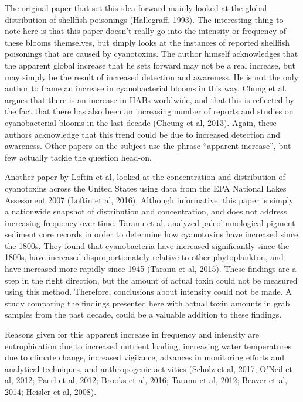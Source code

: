 \documentclass[11pt,]{article}
\begin{document}
The original paper that set this idea forward mainly looked at the
global distribution of shellfish poisonings (Hallegraff, 1993). The
interesting thing to note here is that this paper doesn't really go into
the intensity or frequency of these blooms themselves, but simply looks
at the instances of reported shellfish poisonings that are caused by
cyanotoxins. The author himself acknowledges that the apparent global
increase that he sets forward may not be a real increase, but may simply
be the result of increased detection and awareness. He is not the only
author to frame an increase in cyanobacterial blooms in this way. Chung
et al. argues that there is an increase in HABs worldwide, and that this
is reflected by the fact that there has also been an increasing number
of reports and studies on cyanobacterial blooms in the last decade
(Cheung et al, 2013). Again, these authors acknowledge that this trend
could be due to increased detection and awareness. Other papers on the
subject use the phrase ``apparent increase'', but few actually tackle
the question head-on.

Another paper by Loftin et al, looked at the concentration and
distribution of cyanotoxins across the United States using data from the
EPA National Lakes Assessment 2007 (Loftin et al, 2016). Although
informative, this paper is simply a nationwide snapshot of distribution
and concentration, and does not address increasing frequency over time.
Taranu et al. analyzed paleolimnological pigment sediment core records
in order to determine how cyanotoxins have increased since the 1800s.
They found that cyanobacteria have increased significantly since the
1800s, have increased disproportionately relative to other
phytoplankton, and have increased more rapidly since 1945 (Taranu et al,
2015). These findings are a step in the right direction, but the amount
of actual toxin could not be measured using this method. Therefore,
conclusions about intensity could not be made. A study comparing the
findings presented here with actual toxin amounts in grab samples from
the past decade, could be a valuable addition to these findings.

Reasons given for this apparent increase in frequency and intensity are
eutrophication due to increased nutrient loading, increasing water
temperatures due to climate change, increased vigilance, advances in
monitoring efforts and analytical techniques, and anthropogenic
activities (Scholz et al, 2017; O'Neil et al, 2012; Paerl et al, 2012;
Brooks et al, 2016; Taranu et al, 2012; Beaver et al, 2014; Heisler et
al, 2008).
\end{document}
